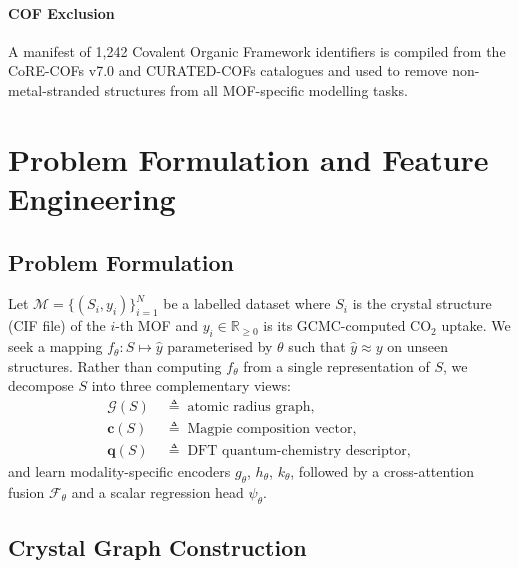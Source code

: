 \documentclass[conference]{IEEEtran}
\begin{document}
\paragraph{COF Exclusion}
A manifest of 1{,}242 Covalent Organic Framework identifiers is compiled
from the CoRE-COFs v7.0 and CURATED-COFs catalogues and used to remove
non-metal-stranded structures from all MOF-specific modelling tasks.

\section{Problem Formulation and Feature Engineering}
\label{sec:features}

\subsection{Problem Formulation}

Let $\mathcal{M} = \{(S_i, y_i)\}_{i=1}^{N}$ be a labelled dataset where
$S_i$ is the crystal structure (CIF file) of the $i$-th MOF and
$y_i \in \mathbb{R}_{\geq 0}$ is its GCMC-computed CO$_2$ uptake.  We seek
a mapping $f_\theta: S \mapsto \hat{y}$ parameterised by $\theta$ such that
$\hat{y} \approx y$ on unseen structures.  Rather than computing $f_\theta$
from a single representation of $S$, we decompose $S$ into three complementary
views:
\begin{align}
  \mathcal{G}(S) &\;\triangleq\; \text{atomic radius graph},
                  \label{eq:G}\\
  \mathbf{c}(S)  &\;\triangleq\; \text{Magpie composition vector},
                  \label{eq:c}\\
  \mathbf{q}(S)  &\;\triangleq\; \text{DFT quantum-chemistry descriptor},
                  \label{eq:q_def}
\end{align}
and learn modality-specific encoders $g_\theta$, $h_\theta$, $k_\theta$,
followed by a cross-attention fusion $\mathcal{F}_\theta$ and a scalar
regression head $\psi_\theta$.

\subsection{Crystal Graph Construction}
\label{sec:graph_const}
\end{document}
